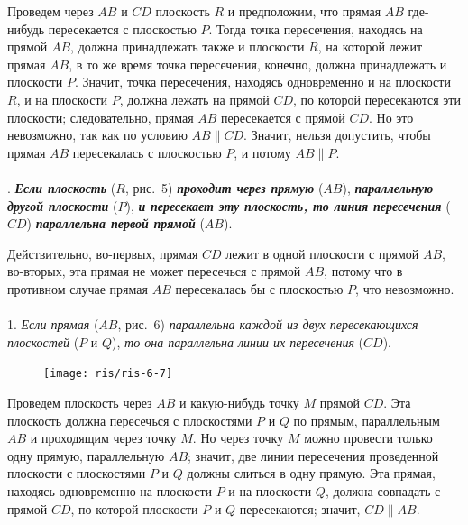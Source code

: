 \documentclass[twoside]{book}
\begin{document}
Проведем через $AB$ и $CD$ плоскость $R$ и предположим, что прямая $AB$ где-нибудь пересекается с плоскостью $P$.
Тогда точка пересечения, находясь на прямой $AB$, должна принадлежать также и плоскости $R$, на которой лежит прямая $AB$, в то же время точка пересечения, конечно, должна принадлежать и плоскости $P$.
Значит, точка пересечения, находясь одновременно и на плоскости $R$, и на плоскости $P$, должна лежать на прямой $CD$, по которой пересекаются эти плоскости;
следовательно, прямая $AB$ пересекается с прямой $CD$.
Но это невозможно, так как по условию $AB\parallel CD$.
Значит, нельзя допустить, чтобы прямая $AB$ пересекалась с плоскостью $P$, и потому $AB\parallel P$.

\paragraph{}\label{1938/s11}
. \textbf{\emph{Если плоскость}} ($R$, рис.~5) \textbf{\emph{проходит через прямую}} ($AB$), \textbf{\emph{параллельную другой плоскости}} ($P$), \textbf{\emph{и пересекает эту плоскость, то линия пересечения}} ($CD$) \textbf{\emph{параллельна первой прямой}} ($AB$).

Действительно, во-первых, прямая $CD$ лежит в одной плоскости с прямой $AB$, во-вторых, эта прямая не может пересечься с прямой $AB$, потому что в противном случае прямая $AB$ пересекалась бы с плоскостью $P$, что невозможно.

\paragraph{}\label{1938/s12}
 1.
\emph{Если прямая} ($AB$, рис.~6) \emph{параллельна каждой из двух пересекающихся плоскостей} ($P$ и $Q$), \emph{то она параллельна линии их пересечения} ($CD$).

\begin{figure}[h!]
\centering
\texttt{[image: ris/ris-6-7]}
\caption{}
\end{figure}

Проведем плоскость через $AB$ и какую-нибудь точку $M$ прямой $CD$.
Эта плоскость должна пересечься с плоскостями $P$ и $Q$ по прямым, параллельным $AB$ и проходящим через точку $M$.
Но через точку $M$ можно провести только одну прямую, параллельную $AB$;
значит, две линии пересечения проведенной плоскости с плоскостями $P$ и $Q$ должны слиться в одну прямую.
Эта прямая, находясь одновременно на плоскости $P$ и на плоскости $Q$, должна совпадать с прямой $CD$, по которой плоскости $P$ и $Q$ пересекаются;
значит, $CD \parallel AB$.
\end{document}
